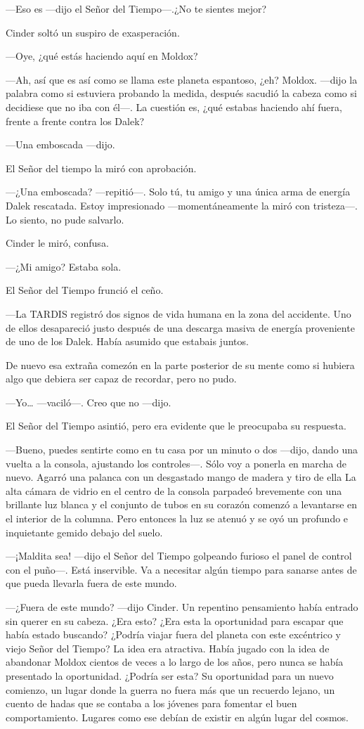 —Eso es —dijo el Señor del Tiempo—.¿No te sientes mejor? 

Cinder soltó un suspiro de exasperación. 

—Oye, ¿qué estás haciendo aquí en Moldox? 

—Ah, así que es así como se llama este planeta espantoso, ¿eh? Moldox. —dijo la palabra como si estuviera probando la medida, después sacudió la cabeza como si decidiese que no iba con él—. La cuestión es, ¿qué estabas haciendo ahí fuera, frente a frente contra los Dalek? 

—Una emboscada —dijo. 

El Señor del tiempo la miró con aprobación. 

—¿Una emboscada? —repitió—. Solo tú, tu amigo y una única arma de energía Dalek rescatada. Estoy impresionado —momentáneamente la miró con tristeza—. Lo siento, no pude salvarlo. 

Cinder le miró, confusa. 

—¿Mi amigo? Estaba sola. 

El Señor del Tiempo frunció el ceño. 

—La TARDIS registró dos signos de vida humana en la zona del accidente. Uno de ellos desapareció justo después de una descarga masiva de energía proveniente de uno de los Dalek. Había asumido que estabais juntos. 

De nuevo esa extraña comezón en la parte posterior de su mente como si hubiera algo que debiera ser capaz de recordar, pero no pudo. 

—Yo… —vaciló—. Creo que no —dijo. 

El Señor del Tiempo asintió, pero era evidente que le preocupaba su respuesta. 

—Bueno, puedes sentirte como en tu casa por un minuto o dos —dijo, dando una vuelta a la consola, ajustando los controles—. Sólo voy a ponerla en marcha de nuevo. Agarró una palanca con un desgastado mango de madera y tiro de ella La alta cámara de vidrio en el centro de la consola parpadeó brevemente con una brillante luz blanca y el conjunto de tubos en su corazón comenzó a levantarse en el interior de la columna. Pero entonces la luz se atenuó y se oyó un profundo e inquietante gemido debajo del suelo. 

—¡Maldita sea! —dijo el Señor del Tiempo golpeando furioso el panel de control con el puño—. Está inservible. Va a necesitar algún tiempo para sanarse antes de que pueda llevarla fuera de este mundo. 

—¿Fuera de este mundo? —dijo Cinder. Un repentino pensamiento había entrado sin querer en su cabeza. ¿Era esto? ¿Era esta la oportunidad para escapar que había estado buscando? ¿Podría viajar fuera del planeta con este excéntrico y viejo Señor del Tiempo? La idea era atractiva. Había jugado con la idea de abandonar Moldox cientos de veces a lo largo de los años, pero nunca se había presentado la oportunidad. ¿Podría ser esta? Su oportunidad para un nuevo comienzo, un lugar donde la guerra no fuera más que un recuerdo lejano, un cuento de hadas que se contaba a los jóvenes para fomentar el buen comportamiento. Lugares como ese debían de existir en algún lugar del cosmos. 

